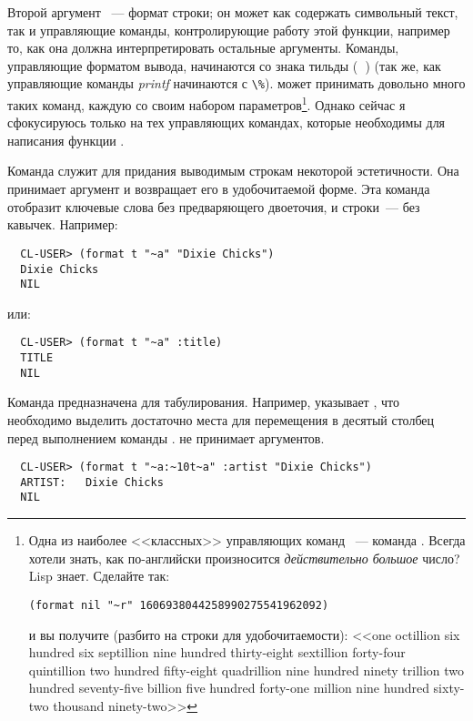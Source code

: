 Второй аргумент ~--- формат строки; он может как содержать символьный текст,
так и управляющие команды, контролирующие работу этой функции, например то, как она должна
интерпретировать остальные аргументы. Команды, управляющие форматом вывода, начинаются со
знака тильды (\textbf{~}) (так же, как управляющие команды \textit{printf} начинаются с
\lstinline{\%}).  может принимать довольно много таких команд, каждую со
своим набором параметров\footnote{Одна из наиболее <<классных>> управляющих команд
  ~--- команда . Всегда хотели знать, как по-английски произносится
  \textit{действительно большое} число? Lisp знает. Сделайте так:

\begin{lstlisting}
(format nil "~r" 1606938044258990275541962092)
\end{lstlisting}

и вы получите (разбито на строки для удобочитаемости): <<one octillion six hundred six
septillion nine hundred thirty-eight sextillion forty-four quintillion two hundred
fifty-eight quadrillion nine hundred ninety trillion two hundred seventy-five billion five
hundred forty-one million nine hundred sixty-two thousand ninety-two>>}. Однако сейчас я
сфокусируюсь только на тех управляющих командах, которые необходимы для написания функции
.

Команда  служит для придания выводимым строкам некоторой эстетичности. Она
принимает аргумент и возвращает его в удобочитаемой форме. Эта команда отобразит ключевые
слова без предваряющего двоеточия, и строки~--- без кавычек. Например:

\begin{verbatim}
  CL-USER> (format t "~a" "Dixie Chicks")
  Dixie Chicks
  NIL
\end{verbatim}

или:

\begin{verbatim}
  CL-USER> (format t "~a" :title)
  TITLE
  NIL
\end{verbatim}

Команда  предназначена для табулирования. Например,  указывает
, что необходимо выделить достаточно места для перемещения в десятый столбец
перед выполнением команды .  не принимает аргументов.

\begin{verbatim}
  CL-USER> (format t "~a:~10t~a" :artist "Dixie Chicks")
  ARTIST:   Dixie Chicks
  NIL
\end{verbatim}

